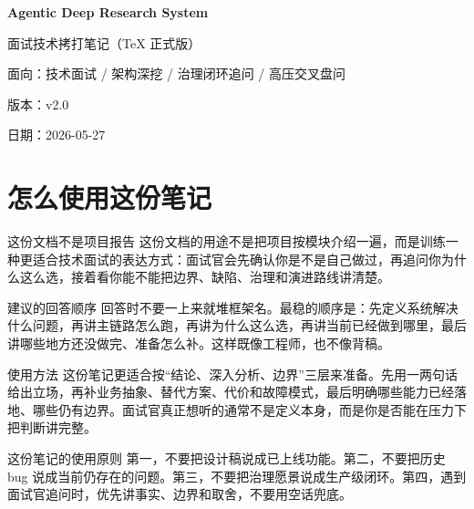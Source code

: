 \documentclass[12pt]{article}
\begin{document}

\begin{titlepage}
  \centering
  \vspace*{3cm}
  {\Huge\bfseries Agentic Deep Research System\par}
  \vspace{0.8cm}
  {\LARGE 面试技术拷打笔记（TeX 正式版）\par}
  \vspace{1.2cm}
  {\large 面向：技术面试 / 架构深挖 / 治理闭环追问 / 高压交叉盘问\par}
  \vfill
  {\large 版本：v2.0\par}
  {\large 日期：2026-05-27\par}
\end{titlepage}

\clearpage
\setcounter{page}{2}
\tableofcontents
\clearpage
{}

\section{怎么使用这份笔记}

\begin{summaryBox}{这份文档不是项目报告}
这份文档的用途不是把项目按模块介绍一遍，而是训练一种更适合技术面试的表达方式：面试官会先确认你是不是自己做过，再追问你为什么这么选，接着看你能不能把边界、缺陷、治理和演进路线讲清楚。
\end{summaryBox}

\begin{qaBox}{建议的回答顺序}
回答时不要一上来就堆框架名。最稳的顺序是：先定义系统解决什么问题，再讲主链路怎么跑，再讲为什么这么选，再讲当前已经做到哪里，最后讲哪些地方还没做完、准备怎么补。这样既像工程师，也不像背稿。
\end{qaBox}

\begin{analysisBox}{使用方法}
这份笔记更适合按“结论、深入分析、边界”三层来准备。先用一两句话给出立场，再补业务抽象、替代方案、代价和故障模式，最后明确哪些能力已经落地、哪些仍有边界。面试官真正想听的通常不是定义本身，而是你是否能在压力下把判断讲完整。
\end{analysisBox}

\begin{riskBox}{这份笔记的使用原则}
第一，不要把设计稿说成已上线功能。第二，不要把历史 bug 说成当前仍存在的问题。第三，不要把治理愿景说成生产级闭环。第四，遇到面试官追问时，优先讲事实、边界和取舍，不要用空话兜底。
\end{riskBox}
\end{document}
